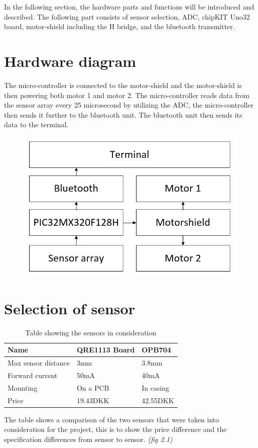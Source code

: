 In the following section, the hardware parts and functions will be introduced and described. The following part consists of sensor selection, ADC, chipKIT Uno32 board, motor-shield including the H bridge, and the bluetooth transmitter.

\section{Hardware diagram}
The micro-controller is connected to the motor-shield and the motor-shield is then powering both motor 1 and motor 2. The micro-controller reads data from the sensor array every 25 microsecond by utilizing the ADC, the micro-controller then sends it further to the bluetooth unit. The bluetooth unit then sends its data to the terminal. 
\begin{figure}[!ht]
	\centering
	\includegraphics[width=.6\textwidth]{figures/hardwaredia.png}
	\caption{}
	\label{Hardware diagram}
\end{figure}
    
\section{Selection of sensor}
\begin{table}[]
	\centering
	\label{Sensor table}
	\begin{tabular}{|l|l|l|}
		\hline
		Name                & QRE1113 Board & OPB704    \\ \hline
		Max sensor distance & 3mm           & 3.8mm     \\ \hline
		Forward current     & 50mA          & 40mA      \\ \hline
		Mounting            & On a PCB      & In casing \\ \hline
		Price               & 19.43DKK      & 42.55DKK  \\ \hline
	\end{tabular}
	\caption{Table showing the sensors in consideration}
\end{table}
The table shows a comparison of the two sensors that were taken into consideration for the project, this is to show the price difference and the specification differences from sensor to sensor. \emph{(fig 2.1)}


